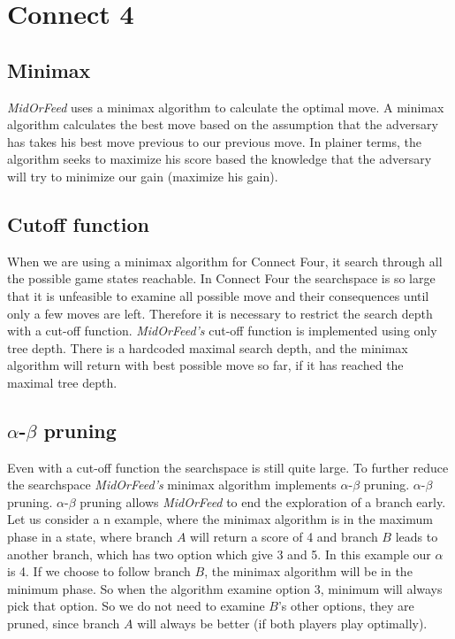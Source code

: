 \section{Connect 4}

\subsection{Minimax}
\textit{MidOrFeed} uses a minimax algorithm to calculate the optimal move. A minimax algorithm calculates the best move based on the assumption that the adversary has takes his best move previous to our previous move. In plainer terms, the algorithm seeks to maximize his score based the knowledge that the adversary will try to minimize our gain (maximize his gain).

\subsection{Cutoff function}
When we are using a minimax algorithm for Connect Four, it search through all the possible game states reachable. In Connect Four the searchspace is so large that it is unfeasible to examine all possible move and their consequences until only a few moves are left. Therefore it is necessary to restrict the search depth with a cut-off function. \textit{MidOrFeed's} cut-off function is implemented using only tree depth. There is a hardcoded maximal search depth, and the minimax algorithm will return with best possible move so far, if it has reached the maximal tree depth.

\subsection{$\alpha$-$\beta$ pruning}
Even with a cut-off function the searchspace is still quite large. To further reduce the searchspace \textit{MidOrFeed's} minimax algorithm implements $\alpha$-$\beta$ pruning. $\alpha$-$\beta$ pruning. $\alpha$-$\beta$ pruning allows \textit{MidOrFeed} to end the exploration of a branch early. Let us consider a n example, where the minimax algorithm is in the maximum phase in a state, where branch $A$ will return a score of 4 and branch $B$ leads to another branch, which has two option which give 3 and 5. In this example our $\alpha$ is 4. If we choose to follow branch $B$, the minimax algorithm will be in the minimum phase. So when the algorithm examine option 3, minimum will always pick that option. So we do not need to examine $B$'s other options, they are pruned, since branch $A$ will always be better (if both players play optimally).

